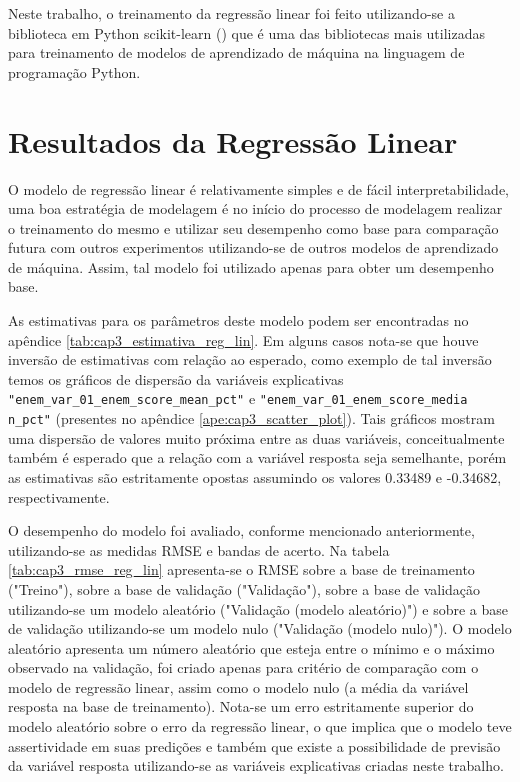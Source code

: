 Neste trabalho, o treinamento da regressão linear foi feito utilizando-se a biblioteca em Python scikit-learn (\citet{Sklearn}) que é uma das bibliotecas mais utilizadas para treinamento de modelos de aprendizado de máquina na linguagem de programação Python.

\section{Resultados da Regressão Linear}
\label{sec:resultados_regressao_linear}

O modelo de regressão linear é relativamente simples e de fácil interpretabilidade, uma boa estratégia de modelagem é no início do processo de modelagem realizar o treinamento do mesmo e utilizar seu desempenho como base para comparação futura com outros experimentos utilizando-se de outros modelos de aprendizado de máquina. Assim, tal modelo foi utilizado apenas para obter um desempenho base.

As estimativas para os parâmetros deste modelo podem ser encontradas no apêndice \ref{tab:cap3_estimativa_reg_lin}. Em alguns casos nota-se que houve inversão de estimativas com relação ao esperado, como exemplo de tal inversão temos os gráficos de dispersão da variáveis explicativas \verb|"enem_var_01_enem_score_mean_pct"| e \verb|"enem_var_01_enem_score_media| \\ \verb|n_pct"| (presentes no apêndice \ref{ape:cap3_scatter_plot}). Tais gráficos mostram uma dispersão de valores muito próxima entre as duas variáveis, conceitualmente também é esperado que a relação com a variável resposta seja semelhante, porém as estimativas são estritamente opostas assumindo os valores 0.33489 e -0.34682, respectivamente.

O desempenho do modelo foi avaliado, conforme mencionado anteriormente, utilizando-se as medidas RMSE e bandas de acerto. Na tabela \ref{tab:cap3_rmse_reg_lin} apresenta-se o RMSE sobre a base de treinamento ("Treino"), sobre a base de validação ("Validação"), sobre a base de validação utilizando-se um modelo aleatório ("Validação (modelo aleatório)") e sobre a base de validação utilizando-se um modelo nulo ("Validação (modelo nulo)"). O modelo aleatório apresenta um número aleatório que esteja entre o mínimo e o máximo observado na validação, foi criado apenas para critério de comparação com o modelo de regressão linear, assim como o modelo nulo (a média da variável resposta na base de treinamento). Nota-se um erro estritamente superior do modelo aleatório sobre o erro da regressão linear, o que implica que o modelo teve assertividade em suas predições e também que existe a possibilidade de previsão da variável resposta utilizando-se as variáveis explicativas criadas neste trabalho.

